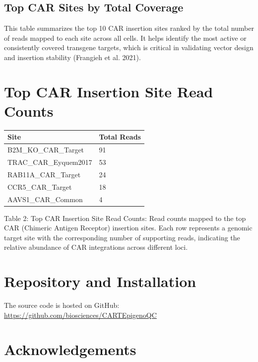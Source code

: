 \documentclass[
]{article}
\begin{document}
\subsection{Top CAR Sites by Total
Coverage}\label{top-car-sites-by-total-coverage}

This table summarizes the top 10 CAR insertion sites ranked by the total
number of reads mapped to each site across all cells. It helps identify
the most active or consistently covered transgene targets, which is
critical in validating vector design and insertion stability (Frangieh
et al. 2021).

\section{Top CAR Insertion Site Read
Counts}\label{top-car-insertion-site-read-counts}

\begingroup
\small  %

\begin{longtable}[]{@{}ll@{}}
\toprule\noalign{}
Site & Total Reads \\
\midrule\noalign{}
\endhead
\bottomrule\noalign{}
\endlastfoot
B2M\_KO\_CAR\_Target & 91 \\
TRAC\_CAR\_Eyquem2017 & 53 \\
RAB11A\_CAR\_Target & 24 \\
CCR5\_CAR\_Target & 18 \\
AAVS1\_CAR\_Common & 4 \\
\end{longtable}

\endgroup

Table 2: Top CAR Insertion Site Read Counts: Read counts mapped to the
top CAR (Chimeric Antigen Receptor) insertion sites. Each row represents
a genomic target site with the corresponding number of supporting reads,
indicating the relative abundance of CAR integrations across different
loci.

\section{Repository and Installation}\label{repository-and-installation}

The source code is hosted on GitHub:\\
\url{https://github.com/biosciences/CARTEpigenoQC}

\section{Acknowledgements}\label{acknowledgements}
\end{document}

